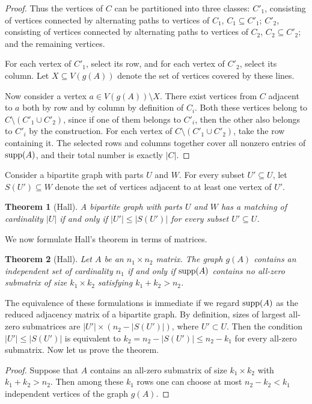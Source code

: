 \documentclass[11pt]{article}
\newtheorem{theorem}{Theorem}[section]
\theoremstyle{definition}
\newcommand{\supp}{{\rm supp}}
\begin{document}
{{{\begin{proof}
Thus the vertices of $C$ can be partitioned into three classes:
$C'_1$, consisting of vertices connected by alternating paths to
vertices of $C_1$, $C_1\subseteq C'_1$;
$C'_2$, consisting of vertices connected by alternating paths to
vertices of $C_2$, $C_2\subseteq C'_2$;
and the remaining vertices.

For each vertex of $C'_1$, select its row, and for each vertex of
$C'_2$, select its column.
Let $X\subseteq V(g(A))$ denote the set of vertices covered by these
lines.

Now consider a vertex
$a\in V(g(A))\setminus X$.
 There exist vertices from $C$ adjacent to $a$ both by
row and by column by definition of $C_i$. Both
these vertices belong to $C\setminus(C'_1\cup C'_2)$,
since if one of them belongs to $C'_i$, then the other also
belongs to $C'_i$  by the construction. For each vertex of $C\setminus(C'_1\cup
C'_2)$, take the row containing it. 
The selected rows and columns together cover all nonzero entries of
$\supp(A)$, and their total number is exactly $|C|$.
\end{proof}

Consider a bipartite graph with parts $U$ and $W$.
For every subset $U'\subseteq U$, let
$S(U')\subseteq W$
denote the set of vertices adjacent to at least one vertex of $U'$.

\begin{theorem}[Hall]
A bipartite graph with parts $U$ and $W$ has a matching of cardinality
$|U|$ if and only if
$|U'|\le |S(U')|$
for every subset $U'\subseteq U$.
\end{theorem}

We now formulate Hall's theorem in terms of matrices.

\begin{theorem}[Hall]
Let $A$ be an $n_1\times n_2$ matrix.
The graph $g(A)$ contains an independent set of cardinality $n_1$ if
and only if $\supp(A)$ contains no all-zero submatrix of size
$k_1\times k_2$ satisfying
$k_1+k_2>n_2$.
\end{theorem}

The equivalence of these formulations is immediate if we regard
$\supp(A)$ as the reduced adjacency matrix of a bipartite graph.
 By definition,  sizes of largest all-zero submatrices are $|U'|\times (n_2- |S(U')|)$, where  $U'\subset U$. Then the condition
$|U'|\leq |S(U')|$ is equivalent to $k_2= n_2-|S(U')|\leq n_2-k_1$ for every all-zero submatrix.  Now let us prove the theorem.


\begin{proof}
Suppose that $A$ contains an all-zero submatrix of size
$k_1\times k_2$ with
$k_1+k_2>n_2$.
Then among these $k_1$ rows one can choose at most
$n_2-k_2<k_1$
independent vertices of the graph $g(A)$.


\end{proof}}}}
\end{document}
